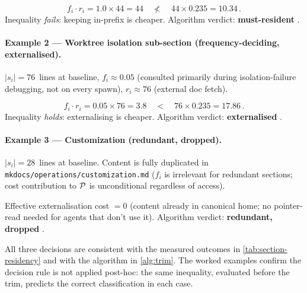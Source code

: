 \[
  f_i \cdot r_i = 1.0 \times 44 = 44 \quad\not<\quad 44 \times 0.235 = 10.34 \,.
\]
Inequality \emph{fails}: keeping in-prefix is cheaper.
Algorithm verdict: \textbf{must-resident} \checkmark.

\paragraph{Example 2 — Worktree isolation sub-section (frequency-deciding, externalised).}
$|s_i| = 76$~lines at baseline, $f_i \approx 0.05$ (consulted primarily
during isolation-failure debugging, not on every spawn),
$r_i \approx 76$ (external doc fetch).

\[
  f_i \cdot r_i = 0.05 \times 76 = 3.8 \quad<\quad 76 \times 0.235 = 17.86 \,.
\]
Inequality \emph{holds}: externalising is cheaper.
Algorithm verdict: \textbf{externalised} \checkmark.

\paragraph{Example 3 — Customization (redundant, dropped).}
$|s_i| = 28$~lines at baseline. Content is fully duplicated in
\texttt{mkdocs/operations/customization.md} ($f_i$ is irrelevant for
redundant sections; cost contribution to $\mathcal{P}$ is unconditional
regardless of access).

Effective externalisation cost $= 0$ (content already in canonical home;
no pointer-read needed for agents that don't use it).
Algorithm verdict: \textbf{redundant, dropped} \checkmark.

\noindent
All three decisions are consistent with the measured outcomes in
\cref{tab:section-residency} and with the algorithm in \cref{alg:trim}.
The worked examples confirm the decision rule is not applied
post-hoc: the same inequality, evaluated before the trim, predicts
the correct classification in each case.
